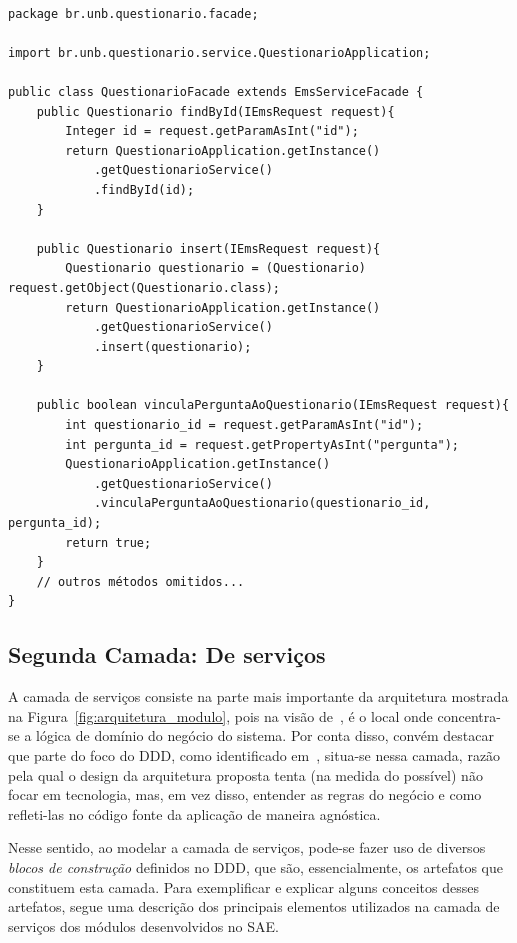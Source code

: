 \renewcommand{\lstlistingname}{Código}             
\begin{lstlisting}[caption=Exemplo de fachada para o serviço QuestionarioService., label=fig:exemplo_fachada] 

package br.unb.questionario.facade;

import br.unb.questionario.service.QuestionarioApplication;

public class QuestionarioFacade extends EmsServiceFacade {
	public Questionario findById(IEmsRequest request){
		Integer id = request.getParamAsInt("id");
		return QuestionarioApplication.getInstance()
			.getQuestionarioService()
			.findById(id);
	}
	
	public Questionario insert(IEmsRequest request){
		Questionario questionario = (Questionario) request.getObject(Questionario.class);
		return QuestionarioApplication.getInstance()
			.getQuestionarioService()
			.insert(questionario);
	}
	
	public boolean vinculaPerguntaAoQuestionario(IEmsRequest request){
		int questionario_id = request.getParamAsInt("id");
		int pergunta_id = request.getPropertyAsInt("pergunta");
		QuestionarioApplication.getInstance()
			.getQuestionarioService()
			.vinculaPerguntaAoQuestionario(questionario_id, pergunta_id);
		return true;
	}
	// outros métodos omitidos...
}
\end{lstlisting}
	
	
\subsection{Segunda Camada: De serviços}	
	
	A camada de serviços consiste na parte mais 
	importante da arquitetura mostrada na Figura~\ref{fig:arquitetura_modulo}, 
	pois na visão de~\cite{evans2004domain, fowler2002patterns},
	é o local onde	concentra-se a lógica de domínio do negócio do sistema.
	Por conta disso, convém destacar que parte
	do foco do \acrshort{DDD},
	como identificado em~\cite{evans2004domain, fowler2002patterns}, 
	situa-se nessa camada, razão pela qual
	o design da arquitetura proposta
	tenta (na medida do possível) 
	não focar em tecnologia, 
	mas, em vez disso, entender as regras do negócio e
	como refleti-las no código fonte da aplicação 
	de maneira agnóstica.

	Nesse sentido, ao modelar a camada de serviços, 
	pode-se fazer uso de diversos \emph{blocos 
	de construção} definidos no \acrshort{DDD},
	que são, essencialmente, os artefatos que constituem
	esta camada. Para exemplificar e explicar 
	alguns conceitos desses artefatos, 
	segue uma descrição
	dos principais elementos utilizados na camada de serviços 
	dos módulos desenvolvidos no \acrshort{SAE}. 
	
